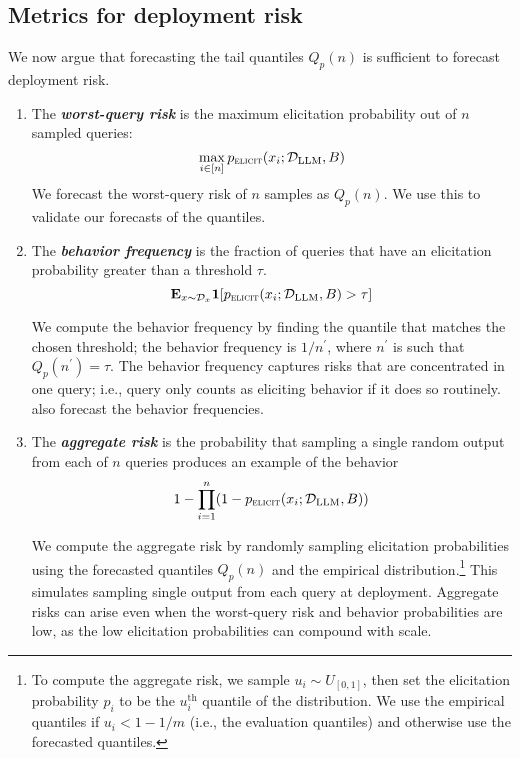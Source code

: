 \subsection{Metrics for deployment risk}
\label{sec:quantities-from-quantiles}
We now argue that forecasting the tail quantiles $Q_p(n)$ is sufficient to forecast deployment risk. 
\begin{enumerate}[leftmargin=*,itemsep=0.3em,topsep=0.3em]
    \item  The \textbf{\emph{worst-query risk}} is the maximum elicitation probability out of $n$ sampled queries:
\vspace{-8pt}
$$\max_{i \in [n]} p_{\textsc{elicit}}(x_i; \mathcal{D}_\text{LLM}, B)$$
We forecast the worst-query risk of $n$ samples as $Q_p(n)$. We use this to validate our forecasts of the quantiles.
    \item The \textbf{\emph{behavior frequency}} is the fraction of queries that have an elicitation probability greater than a threshold $\tau$.
\vspace{-8pt}
$$\mathbf{E}_{x \sim \mathcal{D}_{x}} \mathbf{1}[p_{\textsc{elicit}}(x_i ; \mathcal{D}_\text{LLM}, B) > \tau]$$

We compute the behavior frequency by finding the quantile that matches the chosen threshold; the behavior frequency is $1/n^\prime$, where $n^\prime$ is such that $Q_p(n^\prime) = \tau$. The behavior frequency captures risks that are concentrated in one query; i.e., query only counts as eliciting behavior if it does so routinely.  \citet{wu2024estimating} also forecast the behavior frequencies. 
    \item The \textbf{\emph{aggregate risk}} is the probability that sampling a single random output from each of $n$ queries produces an example of the behavior
\vspace{-8pt}
$$1 - \prod_{i = 1}^n (1 - p_{\textsc{elicit}}(x_i; \mathcal{D}_\text{LLM}, B))$$

We compute the aggregate risk by randomly sampling elicitation probabilities using the forecasted quantiles $Q_p(n)$ and the empirical distribution.\footnote{To compute the aggregate risk, we sample $u_i \sim U_{[0,1]}$, then set the elicitation probability $p_i$ to be the $u_i^{\text{th}}$ quantile of the distribution. We use the empirical quantiles if $u_i < 1 - 1/m$ (i.e., the evaluation quantiles) and otherwise use the forecasted quantiles.} This simulates sampling single output from each query at deployment. Aggregate risks can arise even when the worst-query risk and behavior probabilities are low, as the low elicitation probabilities can compound with scale. 
\end{enumerate}

